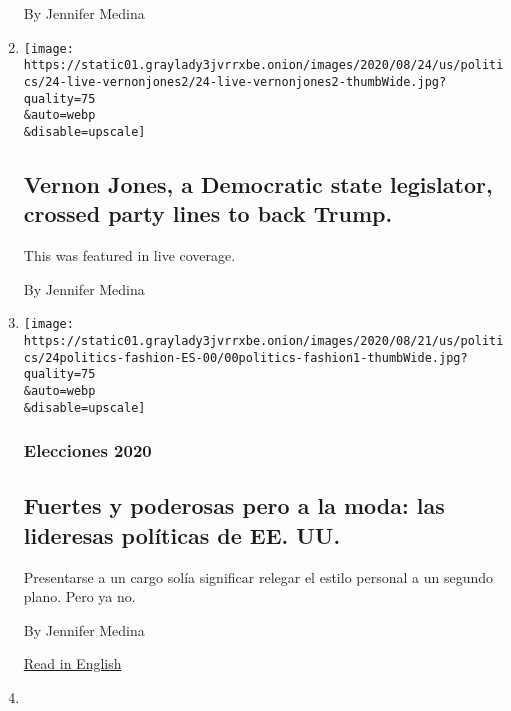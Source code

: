 \begin{enumerate}
  By Jennifer Medina
\item
  \href{/live/2020/08/24/us/rnc-convention-election/vernon-jones-a-democratic-state-legislator-crossed-party-lines-to-back-trump}{}

  \texttt{[image: https://static01.graylady3jvrrxbe.onion/images/2020/08/24/us/politics/24-live-vernonjones2/24-live-vernonjones2-thumbWide.jpg?quality=75\\\&auto=webp\\\&disable=upscale]}

  \hypertarget{vernon-jones-a-democratic-state-legislator-crossed-party-lines-to-back-trump}{%
  \subsection{Vernon Jones, a Democratic state legislator, crossed party
  lines to back
  Trump.}\label{vernon-jones-a-democratic-state-legislator-crossed-party-lines-to-back-trump}}

  This was featured in live coverage.

  By Jennifer Medina
\item
  \href{/es/2020/08/24/espanol/estados-unidos/mujeres-politica-moda.html}{}

  \texttt{[image: https://static01.graylady3jvrrxbe.onion/images/2020/08/21/us/politics/24politics-fashion-ES-00/00politics-fashion1-thumbWide.jpg?quality=75\\\&auto=webp\\\&disable=upscale]}

  \hypertarget{elecciones-2020}{%
  \subsubsection{Elecciones 2020}\label{elecciones-2020}}

  \hypertarget{fuertes-y-poderosas-pero-a-la-moda-las-lideresas-poluxedticas-de-ee-uu}{%
  \subsection{Fuertes y poderosas pero a la moda: las lideresas
  políticas de EE.
  UU.}\label{fuertes-y-poderosas-pero-a-la-moda-las-lideresas-poluxedticas-de-ee-uu}}

  Presentarse a un cargo solía significar relegar el estilo personal a
  un segundo plano. Pero ya no.

  By Jennifer Medina

  \href{https://www.nytimes3xbfgragh.onion/2020/08/22/us/politics/politics-women-dnc-fashion.html}{Read
  in English}
\item
  \href{/live/2020/08/22/us/trump-vs-biden/women-of-color-are-redefining-what-a-politician-looks-like}{}


\end{enumerate}
